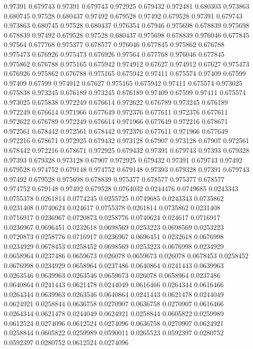 0.97391 0.679743
0.97391 0.679743
0.972925 0.679432
0.972481 0.680303
0.973863 0.680745
0.97528 0.680437
0.97492 0.679528
0.97492 0.679528
0.97391 0.679743
0.973863 0.680745
0.97528 0.680437
0.976354 0.67946
0.975698 0.678839
0.975698 0.678839
0.97492 0.679528
0.97528 0.680437
0.975698 0.678839
0.976046 0.677845
0.97564 0.677768
0.975377 0.678577
0.976046 0.677845
0.975862 0.676788
0.975473 0.676926
0.975473 0.676926
0.97564 0.677768
0.976046 0.677845
0.975862 0.676788
0.975165 0.675942
0.974912 0.67627
0.974912 0.67627
0.975473 0.676926
0.975862 0.676788
0.975165 0.675942
0.97411 0.675574
0.97409 0.67599
0.97409 0.67599
0.974912 0.67627
0.975165 0.675942
0.97411 0.675574
0.973025 0.675838
0.973245 0.676189
0.973245 0.676189
0.97409 0.67599
0.97411 0.675574
0.973025 0.675838
0.972249 0.676614
0.972622 0.676789
0.973245 0.676189
0.972249 0.676614
0.971966 0.677649
0.972376 0.677611
0.972376 0.677611
0.972622 0.676789
0.972249 0.676614
0.971966 0.677649
0.972216 0.678671
0.972561 0.678442
0.972561 0.678442
0.972376 0.677611
0.971966 0.677649
0.972216 0.678671
0.972925 0.679432
0.973128 0.67907
0.973128 0.67907
0.972561 0.678442
0.972216 0.678671
0.972925 0.679432
0.97391 0.679743
0.97393 0.679328
0.97393 0.679328
0.973128 0.67907
0.972925 0.679432
0.97391 0.679743
0.97492 0.679528
0.974752 0.679148
0.974752 0.679148
0.97393 0.679328
0.97391 0.679743
0.97492 0.679528
0.975698 0.678839
0.975377 0.678577
0.975377 0.678577
0.974752 0.679148
0.97492 0.679528
0.0764032 0.0244476
0.0749685 0.0243343
0.0755378 0.0261814
0.0774245 0.0255725
0.0749685 0.0243343
0.0735862 0.0231408
0.0740624 0.024617
0.0755378 0.0261814
0.0735862 0.0231408
0.0716917 0.0236967
0.0720873 0.0258776
0.0740624 0.024617
0.0716917 0.0236967
0.0696451 0.0232618
0.0698569 0.0253223
0.0698569 0.0253223
0.0720873 0.0258776
0.0716917 0.0236967
0.0696451 0.0232618
0.0676998 0.0234929
0.0678453 0.0258452
0.0698569 0.0253223
0.0676998 0.0234929
0.0658964 0.0237486
0.0659673 0.026078
0.0659673 0.026078
0.0678453 0.0258452
0.0676998 0.0234929
0.0658964 0.0237486
0.0640864 0.0241443
0.0639963 0.0263546
0.0639963 0.0263546
0.0659673 0.026078
0.0658964 0.0237486
0.0640864 0.0241443
0.0621478 0.0244049
0.0616466 0.0264344
0.0616466 0.0264344
0.0639963 0.0263546
0.0640864 0.0241443
0.0621478 0.0244049
0.0624921 0.0258844
0.0636758 0.0270907
0.0636758 0.0270907
0.0616466 0.0264344
0.0621478 0.0244049
0.0624921 0.0258844
0.0605822 0.0259989
0.0612524 0.0274096
0.0612524 0.0274096
0.0636758 0.0270907
0.0624921 0.0258844
0.0605822 0.0259989
0.0590011 0.0265523
0.0592397 0.0280752
0.0592397 0.0280752
0.0612524 0.0274096
